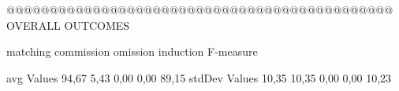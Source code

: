  @@@@@@@@@@@@@@@@@@@@@@@@@@@@@@@@@@@@@@@@@@@@@ OVERALL OUTCOMES

                matching commission   omission  induction   F-measure

avg Values       94,67       5,43       0,00       0,00       89,15        
stdDev Values    10,35       10,35       0,00       0,00        10,23        
